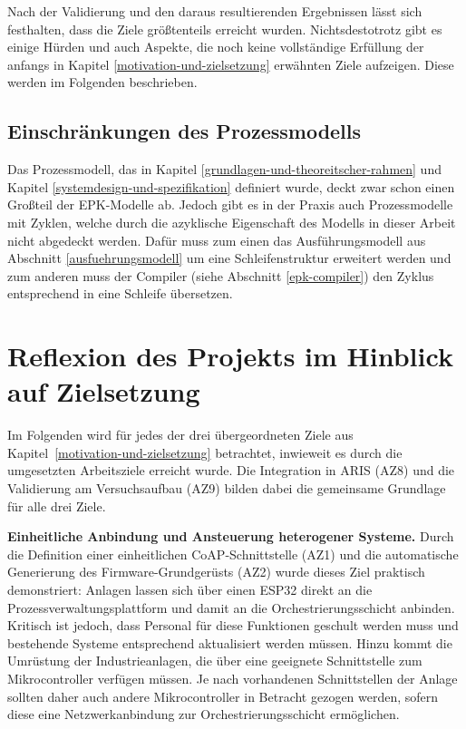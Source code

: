 Nach der Validierung und den daraus resultierenden Ergebnissen lässt sich festhalten, dass die Ziele größtenteils erreicht wurden. Nichtsdestotrotz gibt es einige Hürden und auch Aspekte, die noch keine vollständige Erfüllung 
der anfangs in Kapitel \ref{motivation-und-zielsetzung} erwähnten Ziele aufzeigen. Diese werden im Folgenden beschrieben.

\subsection{Einschränkungen des Prozessmodells}
\label{process-model-limitations}

Das Prozessmodell, das in Kapitel \ref{grundlagen-und-theoreitscher-rahmen} und Kapitel \ref{systemdesign-und-spezifikation} definiert wurde, deckt zwar schon einen Großteil der EPK-Modelle ab.
Jedoch gibt es in der Praxis auch Prozessmodelle mit Zyklen, welche durch die azyklische Eigenschaft des Modells in dieser Arbeit nicht abgedeckt werden. Dafür muss zum einen das Ausführungsmodell aus Abschnitt 
\ref{ausfuehrungsmodell} um eine Schleifenstruktur erweitert werden und zum anderen muss der Compiler (siehe Abschnitt \ref{epk-compiler}) den Zyklus entsprechend in eine Schleife übersetzen.

\section{Reflexion des Projekts im Hinblick auf Zielsetzung}
\label{reflection}

Im Folgenden wird für jedes der drei übergeordneten Ziele aus 
Kapitel~\ref{motivation-und-zielsetzung} betrachtet, inwieweit es durch die umgesetzten 
Arbeitsziele erreicht wurde. Die Integration in ARIS (AZ8) und die Validierung am 
Versuchsaufbau (AZ9) bilden dabei die gemeinsame Grundlage für alle drei Ziele.

\noindent \textbf{Einheitliche Anbindung und Ansteuerung heterogener Systeme.} 
Durch die Definition einer einheitlichen CoAP-Schnittstelle (AZ1) und die automatische 
Generierung des Firmware-Grundgerüsts (AZ2) wurde dieses Ziel praktisch demonstriert: 
Anlagen lassen sich über einen ESP32 direkt an die Prozessverwaltungsplattform und damit 
an die Orchestrierungsschicht anbinden. Kritisch ist jedoch, dass Personal für diese 
Funktionen geschult werden muss und bestehende Systeme entsprechend aktualisiert werden 
müssen. Hinzu kommt die Umrüstung der Industrieanlagen, die über eine geeignete 
Schnittstelle zum Mikrocontroller verfügen müssen. Je nach vorhandenen Schnittstellen 
der Anlage sollten daher auch andere Mikrocontroller in Betracht gezogen werden, sofern 
diese eine Netzwerkanbindung zur Orchestrierungsschicht ermöglichen.

